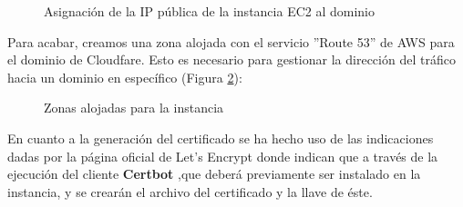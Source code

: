     \begin{figure}[H]
        \caption{Asignación de la IP pública de la instancia EC2 al dominio}
        \label{fig:dns}
    \end{figure}

Para acabar, creamos una zona alojada con el servicio ''Route 53'' de AWS para el dominio de Cloudfare. Esto es necesario para gestionar la dirección del tráfico hacia un dominio en específico (Figura \ref{fig:aws-zone}):

    \begin{figure}[H]
        \caption{Zonas alojadas para la instancia}
        \label{fig:aws-zone}
    \end{figure}

En cuanto a la generación del certificado se ha hecho uso de las indicaciones dadas por la página oficial de Let's Encrypt donde indican que a través de la ejecución del cliente \textbf{Certbot} ,que deberá previamente ser instalado en la instancia, y se crearán el archivo del certificado y la llave de éste. 